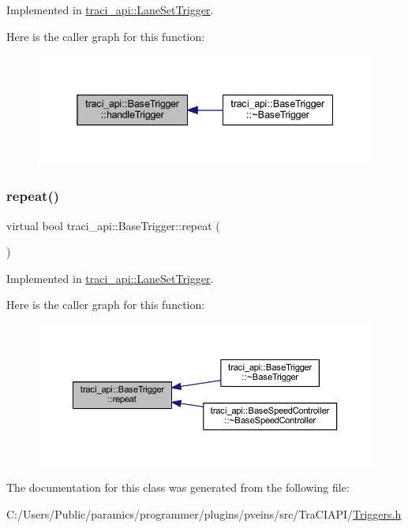 Implemented in \hyperlink{classtraci__api_1_1_lane_set_trigger_a9bc702339daf8aa0d905e3bab5ff2dc3}{traci\+\_\+api\+::\+Lane\+Set\+Trigger}.

Here is the caller graph for this function\+:\nopagebreak
\begin{figure}[H]
\begin{center}
\leavevmode
\includegraphics[width=338pt]{classtraci__api_1_1_base_trigger_a2de2824fb1d228d4c04aa15c272017a5_icgraph}
\end{center}
\end{figure}
\mbox{\label{classtraci__api_1_1_base_trigger_a7d2b1ac3f54e42e71eae69f1c7f33943}} 
\subsubsection{\texorpdfstring{repeat()}{repeat()}}
{\footnotesize\ttfamily virtual bool traci\+\_\+api\+::\+Base\+Trigger\+::repeat (\begin{DoxyParamCaption}{ }\end{DoxyParamCaption})\hspace{0.3cm}{\ttfamily [pure virtual]}}



Implemented in \hyperlink{classtraci__api_1_1_lane_set_trigger_ae606560cb760e12b0f1a86407f614e18}{traci\+\_\+api\+::\+Lane\+Set\+Trigger}.

Here is the caller graph for this function\+:\nopagebreak
\begin{figure}[H]
\begin{center}
\leavevmode
\includegraphics[width=350pt]{classtraci__api_1_1_base_trigger_a7d2b1ac3f54e42e71eae69f1c7f33943_icgraph}
\end{center}
\end{figure}


The documentation for this class was generated from the following file\+:\begin{DoxyCompactItemize}
\item 
C\+:/\+Users/\+Public/paramics/programmer/plugins/pveins/src/\+Tra\+C\+I\+A\+P\+I/\hyperlink{_triggers_8h}{Triggers.\+h}\end{DoxyCompactItemize}
